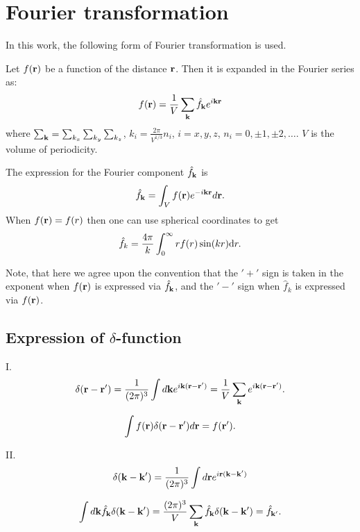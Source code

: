 \section{\label{sec:fourier} Fourier transformation}
In this work, the following form of Fourier transformation is used.

Let $f(\vb r)$ be a function of the distance $\vb r$. Then it is expanded in the Fourier series as:
\begin{equation}
	f(\vb r) = \frac{1}{V} \sum_{\vb k} \hat{f}_{\vb k} e^{i\vb k \vb r}
\end{equation}
where $\sum_{\vb k} = \sum_{k_x}\sum_{k_y}\sum_{k_z}$, $k_i = \frac{2\pi}{V^{1/3}}n_i$, $i=x,y,z$, $n_i=0,\pm 1, \pm 2, \dotsc$. $V$ is the volume of periodicity.

The expression for the Fourier component $\hat{f}_{\vb k}$ is
\begin{equation}
	\hat{f}_{\vb k} = \int_V f(\vb r) e^{-i\vb k \vb r} d{\vb r}.
\end{equation}
When $f(\vb r) = f(r)$ then one can use spherical coordinates to get
\begin{equation}
	\hat{f}_{k} = \frac{4\pi}{k}\int_{0}^{\infty} r f(r) \sin(kr) {\rm d} r.
\end{equation}

Note, that here we agree upon the convention that the $'+'$ sign is taken in the exponent when $f(\vb r)$ is expressed via $\hat{f}_{\vb k}$, and the $'-'$ sign when $\hat{f}_{k}$ is expressed via $f(\vb r)$.

\subsection*{Expression of $\delta$-function}

I.
\begin{equation}
	\delta(\vb r - \vb r') = \frac{1}{(2\pi)^3}\int d {\vb k} e^{i\vb k (\vb r - \vb r')} = \frac{1}{V} \sum_{\vb k} e^{i\vb k(\vb r - \vb r')}.
\end{equation}

\begin{equation}
	\int f(\vb r) \delta(\vb r - \vb r') d {\vb r} = f(\vb r').
\end{equation}

II.
\begin{equation}
	\delta(\vb k - \vb k') = \frac{1}{(2\pi)^3} \int d{\vb r} e^{i\vb r (\vb k - \vb k')}
\end{equation}

\begin{equation}
	\int d{\vb k} \hat{f}_{\vb k} \delta(\vb k - \vb k') = \frac{(2\pi)^3}{V} \sum_{\vb k} \hat{f}_{\vb k} \delta(\vb k - \vb k') = \hat{f}_{\vb k'}.
\end{equation}

